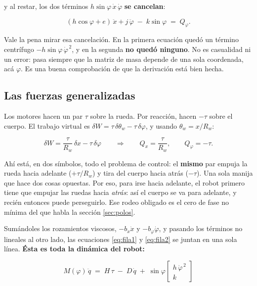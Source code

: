 \documentclass[11pt,a4paper]{report}
\begin{document}
y al restar, los dos términos $h\sin\varphi\,\dot x\,\dot\varphi$ \textbf{se cancelan}:

\begin{equation}\label{eq:fila2}
(h\cos\varphi + e)\,\ddot x + j\,\ddot\varphi \;-\; k\sin\varphi \;=\; Q_\varphi .
\end{equation}

\begin{idea}
Vale la pena mirar esa cancelación. En la primera ecuación quedó un término centrífugo
$-h\sin\varphi\,\dot\varphi^{\,2}$, y en la segunda \textbf{no quedó ninguno}. No es casualidad
ni un error: pasa siempre que la matriz de masa depende de una sola coordenada, acá $\varphi$.
Es una buena comprobación de que la derivación está bien hecha.
\end{idea}

\subsection{Las fuerzas generalizadas}

Los motores hacen un par $\tau$ sobre la rueda. Por reacción, hacen $-\tau$ sobre el cuerpo.
El trabajo virtual es $\delta W = \tau\,\delta\theta_w - \tau\,\delta\varphi$, y usando
$\theta_w = x/R_w$:

\begin{equation}
\delta W = \frac{\tau}{R_w}\,\delta x - \tau\,\delta\varphi
\qquad\Longrightarrow\qquad
Q_x = \frac{\tau}{R_w}, \qquad Q_\varphi = -\tau .
\end{equation}

\begin{idea}
Ahí está, en dos símbolos, todo el problema de control: el \textbf{mismo} par empuja la rueda
hacia adelante ($+\tau/R_w$) y tira del cuerpo hacia atrás ($-\tau$). Una sola manija que hace
dos cosas opuestas. Por eso, para irse hacia adelante, el robot primero tiene que empujar las
ruedas hacia \emph{atrás}: así el cuerpo se va para adelante, y recién entonces puede
perseguirlo. Ese rodeo obligado es el cero de fase no mínima del que habla la sección
\ref{sec:polos}.
\end{idea}

Sumándoles los rozamientos viscosos, $-b_x\dot x$ y $-b_\varphi\dot\varphi$, y pasando los
términos no lineales al otro lado, las ecuaciones \eqref{eq:fila1} y \eqref{eq:fila2} se juntan
en una sola línea. \textbf{Ésta es toda la dinámica del robot:}

\begin{equation}\label{eq:planta}
\boxed{\;M(\varphi)\,\ddot q \;=\; H\,\tau \;-\; D\,\dot q \;+\; \sin\varphi
\begin{bmatrix} h\,\dot\varphi^{\,2} \\ k \end{bmatrix}\;}
\end{equation}
\end{document}
